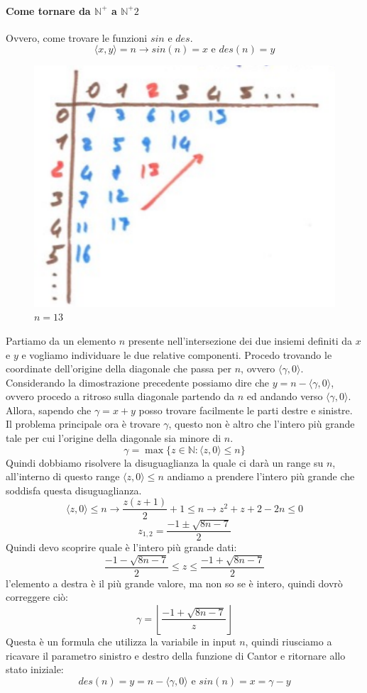 \documentclass{article}
\begin{document}
\paragraph{Come tornare da $\mathbb{N}^+$ a $\mathbb{N}^+2$}
Ovvero, come trovare le funzioni $sin$ e $des$.
$$\langle x,y \rangle = n \longrightarrow sin(n)=x \text{ e } des(n)=y$$
\begin{figure}
    \centering
    \includegraphics[scale=0.5]{images/coord_dim_2.png}
    \caption{$n=13$}
\end{figure}
Partiamo da un elemento $n$ presente nell'intersezione dei due insiemi definiti da
$x$ e $y$ e vogliamo individuare le due relative componenti. Procedo trovando
le coordinate dell'origine della diagonale che passa per $n$, ovvero $\langle\gamma ,0\rangle$.
Considerando la dimostrazione precedente possiamo dire che $y = n-\langle\gamma ,0\rangle$, ovvero
procedo a ritroso sulla diagonale partendo da $n$ ed andando verso $\langle\gamma ,0\rangle$.\\Allora,
sapendo che $\gamma=x+y$ posso trovare facilmente le parti destre e sinistre.\\ Il problema principale
ora è trovare $\gamma$, questo non è altro che l'intero più grande tale per cui l'origine
della diagonale sia minore di $n$.
$$\gamma = \max\{z\in\mathbb{N}:\langle z,0\rangle\leq n\}$$
Quindi dobbiamo risolvere la disuguaglianza la quale ci darà un range su $n$, all'interno di questo
range $\langle z,0\rangle\leq n$ andiamo a prendere l'intero più grande che soddisfa questa disuguaglianza.
$$\langle z,0\rangle\leq n\longrightarrow\frac{z(z+1)}{2}+1\leq n\longrightarrow z^2+z+2-2n\leq 0$$
$$z_{1,2}=\frac{-1 \pm\sqrt{8n-7}}{2}$$
Quindi devo scoprire quale è l'intero più grande dati:
$$\frac{-1 -\sqrt{8n-7}}{2}\leq z\leq \frac{-1 +\sqrt{8n-7}}{2} $$
l'elemento a destra è il più grande valore, ma non so se è intero, quindi dovrò correggere ciò:
$$\gamma=\left\lfloor\frac{-1+\sqrt{8n-7}}{z} \right\rfloor$$
Questa è un formula che utilizza la variabile in input $n$, quindi riusciamo a ricavare il parametro
sinistro e destro della funzione di Cantor e ritornare allo stato iniziale:
$$des(n)=y=n-\langle\gamma ,0\rangle \text{ e }sin(n)=x=\gamma -y$$
\end{document}
